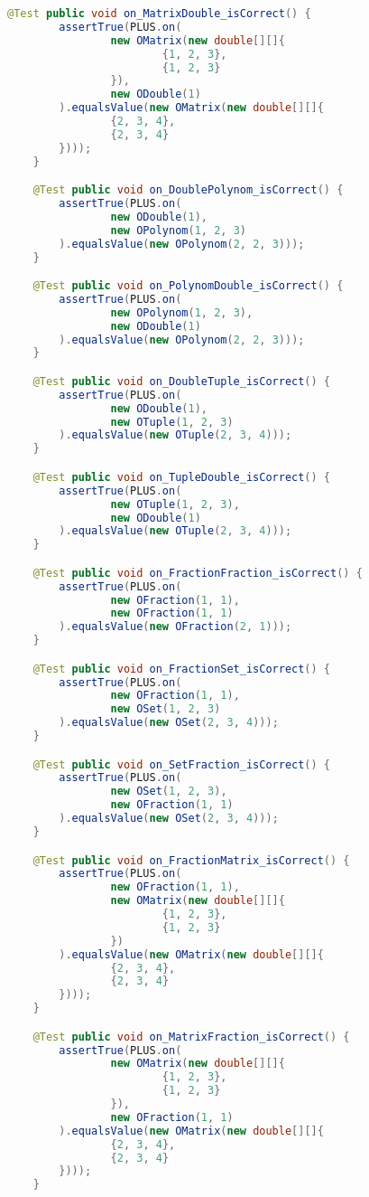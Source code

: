 \begin{lstlisting}[caption=PlusTest (Falk),label=list:PlusTest,language=Java]
    @Test public void on_MatrixDouble_isCorrect() {
        assertTrue(PLUS.on(
                new OMatrix(new double[][]{
                        {1, 2, 3},
                        {1, 2, 3}
                }),
                new ODouble(1)
        ).equalsValue(new OMatrix(new double[][]{
                {2, 3, 4},
                {2, 3, 4}
        })));
    }

    @Test public void on_DoublePolynom_isCorrect() {
        assertTrue(PLUS.on(
                new ODouble(1),
                new OPolynom(1, 2, 3)
        ).equalsValue(new OPolynom(2, 2, 3)));
    }

    @Test public void on_PolynomDouble_isCorrect() {
        assertTrue(PLUS.on(
                new OPolynom(1, 2, 3),
                new ODouble(1)
        ).equalsValue(new OPolynom(2, 2, 3)));
    }

    @Test public void on_DoubleTuple_isCorrect() {
        assertTrue(PLUS.on(
                new ODouble(1),
                new OTuple(1, 2, 3)
        ).equalsValue(new OTuple(2, 3, 4)));
    }

    @Test public void on_TupleDouble_isCorrect() {
        assertTrue(PLUS.on(
                new OTuple(1, 2, 3),
                new ODouble(1)
        ).equalsValue(new OTuple(2, 3, 4)));
    }

    @Test public void on_FractionFraction_isCorrect() {
        assertTrue(PLUS.on(
                new OFraction(1, 1),
                new OFraction(1, 1)
        ).equalsValue(new OFraction(2, 1)));
    }

    @Test public void on_FractionSet_isCorrect() {
        assertTrue(PLUS.on(
                new OFraction(1, 1),
                new OSet(1, 2, 3)
        ).equalsValue(new OSet(2, 3, 4)));
    }

    @Test public void on_SetFraction_isCorrect() {
        assertTrue(PLUS.on(
                new OSet(1, 2, 3),
                new OFraction(1, 1)
        ).equalsValue(new OSet(2, 3, 4)));
    }

    @Test public void on_FractionMatrix_isCorrect() {
        assertTrue(PLUS.on(
                new OFraction(1, 1),
                new OMatrix(new double[][]{
                        {1, 2, 3},
                        {1, 2, 3}
                })
        ).equalsValue(new OMatrix(new double[][]{
                {2, 3, 4},
                {2, 3, 4}
        })));
    }

    @Test public void on_MatrixFraction_isCorrect() {
        assertTrue(PLUS.on(
                new OMatrix(new double[][]{
                        {1, 2, 3},
                        {1, 2, 3}
                }),
                new OFraction(1, 1)
        ).equalsValue(new OMatrix(new double[][]{
                {2, 3, 4},
                {2, 3, 4}
        })));
    }


\end{lstlisting}
